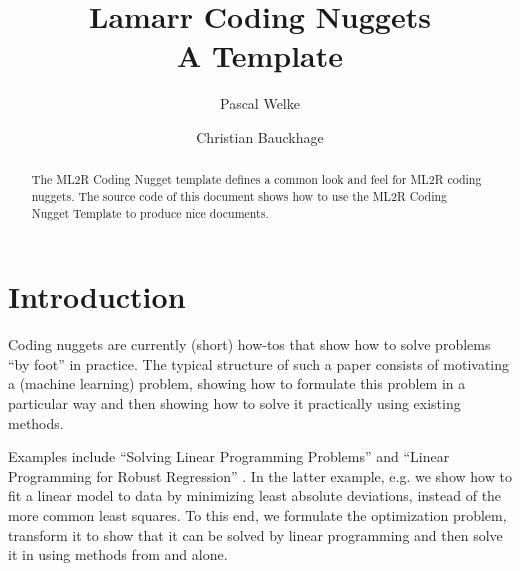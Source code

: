 \documentclass[fleqn,svgnames]{lamarrreport}
\begin{document}


\title[Linear Programming for Robust Regression]{Lamarr Coding Nuggets \\ A Template}


\author[P. Welke]{Pascal Welke}

\author[C. Bauckhage]{Christian Bauckhage}

\begin{abstract}
The ML2R Coding Nugget template defines a common look and feel for ML2R coding nuggets. 
The source code of this document shows how to use the ML2R Coding Nugget Template to produce nice documents.
\end{abstract}

\maketitle



\section{Introduction}
Coding nuggets are currently (short) how-tos that show how to solve problems ``by foot'' in practice.
The typical structure of such a paper consists of motivating a (machine learning) problem, showing how to formulate this problem in a particular way and then showing how to solve it practically using existing methods. 

Examples include  ``Solving Linear Programming Problems'' \cite{Welke2020-SLP} and ``Linear Programming for Robust Regression'' \cite{Welke2020-SLP2}.
In the latter example, e.g. we show how to fit a linear model to data by minimizing least absolute deviations, instead of the more common least squares. 
To this end, we formulate the optimization problem, transform it to show that it can be solved by linear programming and then solve it in  using methods from  and  alone.  
\end{document}
